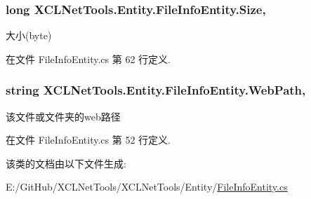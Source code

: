 \subsubsection[{\texorpdfstring{Size}{Size}}]{\setlength{\rightskip}{0pt plus 5cm}long X\+C\+L\+Net\+Tools.\+Entity.\+File\+Info\+Entity.\+Size\hspace{0.3cm}{\ttfamily [get]}, {\ttfamily [set]}}\hypertarget{class_x_c_l_net_tools_1_1_entity_1_1_file_info_entity_a7447a43994e75793388e160a626ba346}{}\label{class_x_c_l_net_tools_1_1_entity_1_1_file_info_entity_a7447a43994e75793388e160a626ba346}


大小(byte) 



在文件 File\+Info\+Entity.\+cs 第 62 行定义.

\subsubsection[{\texorpdfstring{Web\+Path}{WebPath}}]{\setlength{\rightskip}{0pt plus 5cm}string X\+C\+L\+Net\+Tools.\+Entity.\+File\+Info\+Entity.\+Web\+Path\hspace{0.3cm}{\ttfamily [get]}, {\ttfamily [set]}}\hypertarget{class_x_c_l_net_tools_1_1_entity_1_1_file_info_entity_ab93bd802770bb40cc0abdfd35d2fbbc6}{}\label{class_x_c_l_net_tools_1_1_entity_1_1_file_info_entity_ab93bd802770bb40cc0abdfd35d2fbbc6}


该文件或文件夹的web路径 



在文件 File\+Info\+Entity.\+cs 第 52 行定义.



该类的文档由以下文件生成\+:\begin{DoxyCompactItemize}
\item 
E\+:/\+Git\+Hub/\+X\+C\+L\+Net\+Tools/\+X\+C\+L\+Net\+Tools/\+Entity/\hyperlink{_file_info_entity_8cs}{File\+Info\+Entity.\+cs}\end{DoxyCompactItemize}
